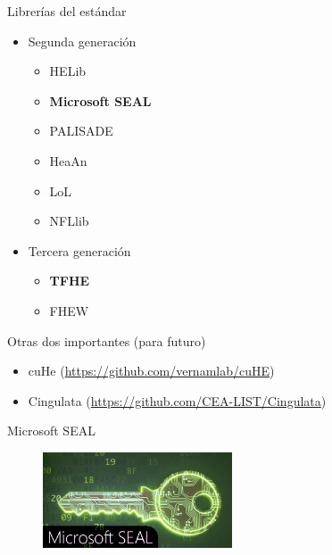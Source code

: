\documentclass{beamer}
\begin{document}
\begin{frame}{Librerías del estándar}
    \begin{itemize}
        \item Segunda generación
        \begin{itemize}
            \item HELib
            \item \textbf{Microsoft SEAL}
            \item PALISADE
            \item HeaAn
            \item LoL
            \item NFLlib
        \end{itemize}
        \item Tercera generación
        \begin{itemize}
            \item \textbf{TFHE}
            \item FHEW
        \end{itemize}
    \end{itemize}
    
    \begin{alertblock}{Otras dos importantes (para futuro)}    
        \begin{itemize}
            \item cuHe (\url{https://github.com/vernamlab/cuHE})
            \item Cingulata (\url{https://github.com/CEA-LIST/Cingulata})
        \end{itemize}
    \end{alertblock}

\end{frame}

\begin{frame}{Microsoft SEAL}

    \begin{figure}[H]
        \centering\includegraphics[width=0.5\textwidth]{logo_seal}
    \end{figure}
    
\end{frame}
\end{document}
